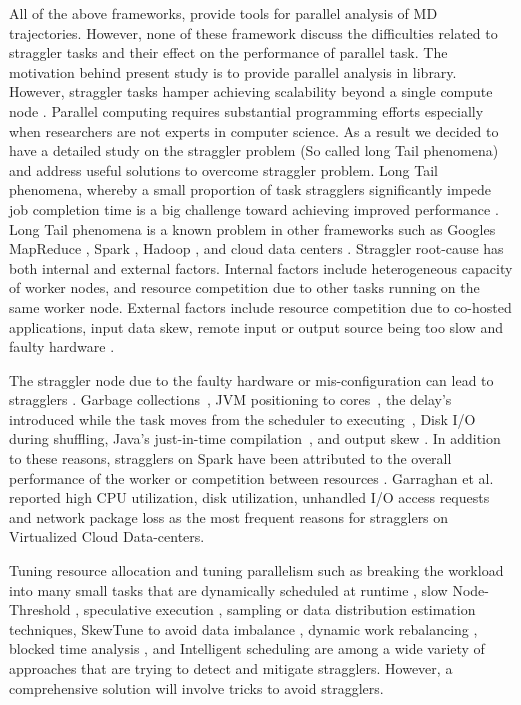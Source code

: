 All of the above frameworks, provide tools for parallel analysis of MD trajectories. 
However, none of these framework discuss the difficulties related to straggler tasks and their effect on the performance of parallel task.
The motivation behind present study is to provide parallel analysis in  library.
However, straggler tasks hamper achieving scalability beyond a single compute node \cite{Khoshlessan:2017ab}. 
Parallel computing requires substantial programming efforts especially when researchers are not experts in computer science.
As a result we decided to have a detailed study on the straggler problem (So called long Tail phenomena) and address useful solutions to overcome straggler problem.
Long Tail phenomena, whereby a small proportion of task stragglers significantly impede job completion time is a big challenge toward achieving improved performance \cite{Garraghan2016}.
Long Tail phenomena is a known problem in other frameworks such as Google\textsc{}s MapReduce \cite{Dean2004}, Spark \cite{Kyong2017,Ousterhout2017,Gittens2016}, Hadoop \cite{Dean2004}, and cloud data centers \cite{Schmidt2016}. Straggler root-cause has both internal and external factors. 
Internal factors include heterogeneous capacity of worker nodes, and resource competition due to other tasks running on the same worker node. 
External factors include resource competition due to co-hosted applications, input data skew, remote input or output source being too slow and faulty hardware \cite{Chen2014}.

The straggler node due to the faulty hardware or mis-configuration can lead to stragglers \cite{Dean2004}. 
Garbage collections~\cite{Kyong2017,Ousterhout2017}, JVM positioning to cores~\cite{Kyong2017}, the delay's introduced while the task moves from the scheduler to executing~\cite{Gittens2016}, Disk I/O during shuffling, Java's just-in-time compilation~\cite{Ousterhout2017}, and output skew \cite{Ousterhout2017}. 
In addition to these reasons, stragglers on Spark have been attributed to the overall performance of the worker or competition between resources \cite{Yang2016}.
Garraghan et al. \cite{Garraghan2016} reported high CPU utilization, disk utilization, unhandled I/O access requests and network package loss as the most frequent reasons for stragglers on Virtualized Cloud Data-centers.

Tuning resource allocation and tuning parallelism such as breaking the workload into many small tasks that are dynamically scheduled at runtime \cite{Rosen2012}, slow Node-Threshold \cite{Dean2004}, speculative execution \cite{Dean2004}, sampling or data distribution estimation techniques, SkewTune to avoid data imbalance \cite{Kwon2012}, dynamic work rebalancing \cite{Schmidt2016}, blocked time analysis \cite{Ousterhout2015}, and Intelligent scheduling \cite{AWE-WQ2014} are among a wide variety of approaches that are trying to detect and mitigate stragglers. 
However, a comprehensive solution will involve tricks to avoid stragglers. 

